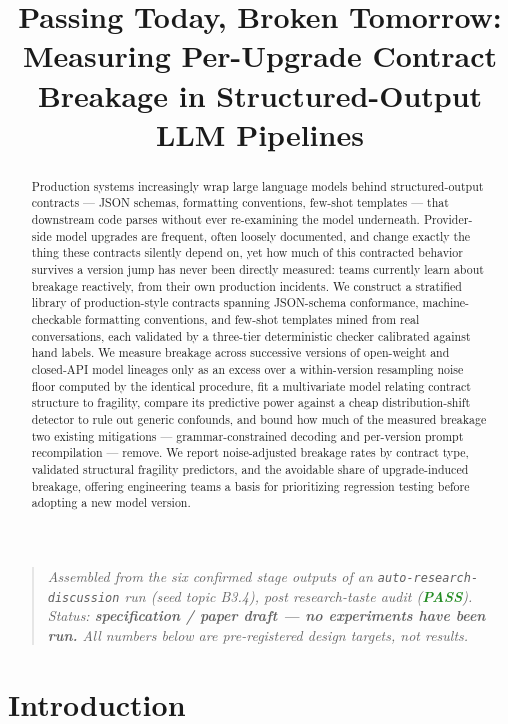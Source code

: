 \documentclass[11pt]{article}
\title{\textbf{Passing Today, Broken Tomorrow:\\ Measuring Per-Upgrade Contract Breakage in Structured-Output LLM Pipelines}}
\author{}
\date{}
\begin{document}
\maketitle
\vspace{-2em}

\begin{quote}
\small\textit{Assembled from the six confirmed stage outputs of an \texttt{auto-research-discussion} run (seed topic B3.4), post research-taste audit (\textcolor{ForestGreen}{\textbf{PASS}}). Status: \textbf{specification / paper draft --- no experiments have been run.} All numbers below are pre-registered design targets, not results.}
\end{quote}

\begin{abstract}
Production systems increasingly wrap large language models behind structured-output contracts --- JSON schemas, formatting conventions, few-shot templates --- that downstream code parses without ever re-examining the model underneath. Provider-side model upgrades are frequent, often loosely documented, and change exactly the thing these contracts silently depend on, yet how much of this contracted behavior survives a version jump has never been directly measured: teams currently learn about breakage reactively, from their own production incidents. We construct a stratified library of production-style contracts spanning JSON-schema conformance, machine-checkable formatting conventions, and few-shot templates mined from real conversations, each validated by a three-tier deterministic checker calibrated against hand labels. We measure breakage across successive versions of open-weight and closed-API model lineages only as an excess over a within-version resampling noise floor computed by the identical procedure, fit a multivariate model relating contract structure to fragility, compare its predictive power against a cheap distribution-shift detector to rule out generic confounds, and bound how much of the measured breakage two existing mitigations --- grammar-constrained decoding and per-version prompt recompilation --- remove. We report noise-adjusted breakage rates by contract type, validated structural fragility predictors, and the avoidable share of upgrade-induced breakage, offering engineering teams a basis for prioritizing regression testing before adopting a new model version.
\end{abstract}

\section{Introduction}
\end{document}
